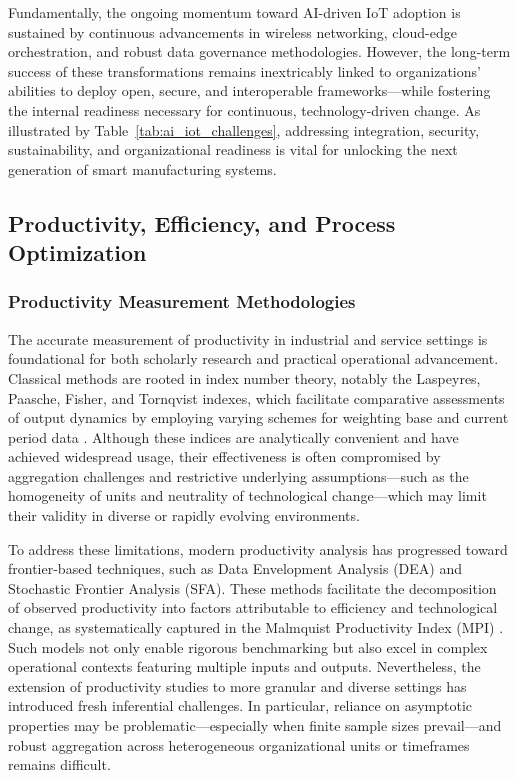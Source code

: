 Fundamentally, the ongoing momentum toward AI-driven IoT adoption is sustained by continuous advancements in wireless networking, cloud-edge orchestration, and robust data governance methodologies. However, the long-term success of these transformations remains inextricably linked to organizations' abilities to deploy open, secure, and interoperable frameworks—while fostering the internal readiness necessary for continuous, technology-driven change. As illustrated by Table~\ref{tab:ai_iot_challenges}, addressing integration, security, sustainability, and organizational readiness is vital for unlocking the next generation of smart manufacturing systems.

\subsection{Productivity, Efficiency, and Process Optimization}

\subsubsection{Productivity Measurement Methodologies}

The accurate measurement of productivity in industrial and service settings is foundational for both scholarly research and practical operational advancement. Classical methods are rooted in index number theory, notably the Laspeyres, Paasche, Fisher, and Tornqvist indexes, which facilitate comparative assessments of output dynamics by employing varying schemes for weighting base and current period data \cite{ref86}. Although these indices are analytically convenient and have achieved widespread usage, their effectiveness is often compromised by aggregation challenges and restrictive underlying assumptions—such as the homogeneity of units and neutrality of technological change—which may limit their validity in diverse or rapidly evolving environments.

To address these limitations, modern productivity analysis has progressed toward frontier-based techniques, such as Data Envelopment Analysis (DEA) and Stochastic Frontier Analysis (SFA). These methods facilitate the decomposition of observed productivity into factors attributable to efficiency and technological change, as systematically captured in the Malmquist Productivity Index (MPI) \cite{ref86}. Such models not only enable rigorous benchmarking but also excel in complex operational contexts featuring multiple inputs and outputs. Nevertheless, the extension of productivity studies to more granular and diverse settings has introduced fresh inferential challenges. In particular, reliance on asymptotic properties may be problematic—especially when finite sample sizes prevail—and robust aggregation across heterogeneous organizational units or timeframes remains difficult.

